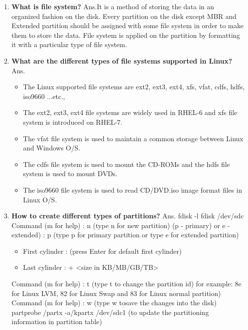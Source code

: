 \begin{enumerate}
\begin{enumerate}
  \bigskip
  \bigskip

  \item \textbf{What is file system?}
  \newline
  Ans.It is a method of storing the data in an organized fashion on the disk. Every partition on the disk except MBR and 	Extended partition should be assigned with some file system in order to make them to store the data. File system is applied on the partition by formatting it with a particular type of file system.
  
  \bigskip
  \bigskip

  \item \textbf{What are the different types of file systems supported in Linux?}
  \newline
  Ans.\begin{itemize}
        \item The Linux supported file systems are ext2, ext3, ext4, xfs, vfat, cdfs, hdfs, iso9660 ...etc.,
        \item  The ext2, ext3, ext4 file systems are widely used in RHEL-6 and xfs file system is introduced on RHEL-7. 
        \item The vfat file system is used to maintain a common storage between Linux and Windows O/S.
        \item The cdfs file system is used to mount the CD-ROMs and the hdfs file system is used to mount DVDs.
        \item The iso9660 file system is used to read CD/DVD.iso image format files in Linux O/S.
  \end{itemize}

  \bigskip
  \bigskip
  
  \item \textbf{How to create different types of partitions?}
  \newline
  Ans. fdisk -l fdisk /dev/sdc
	   Command (m for help) : n   (type n for new partition)
	  (p - primary) or e - extended) : p (type p for primary partition or type e for extended partition)
    \begin{itemize}
      \item First cylinder :  (press Enter for default first cylinder)
	    \item Last cylinder :  + <size in KB/MB/GB/TB>
	  \end{itemize}
	  Command (m for help) : t   (type   t   to change the partition id)
    for example:    8e for Linux LVM,   82  for Linux Swap   and  83  for  Linux normal partition)
		Command (m for help) : w        (type   w   tosave the changes into the disk)
	  partprobe /partx  -a/kpartx   /dev/sdc1       (to update the partitioning information in partition table)
  

\end{enumerate}
\end{enumerate}
